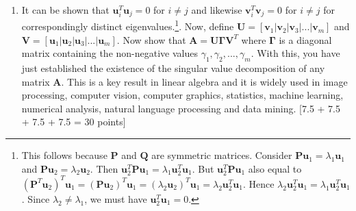 \documentclass[11pt]{article}
\begin{document}
\begin{enumerate}
\begin{enumerate}
\item It can be shown that $\boldsymbol{u}^T_i \boldsymbol{u}_j = 0$ for $i \neq j$ and likewise $\boldsymbol{v}^T_i \boldsymbol{v}_j = 0$ for $i \neq j$ for correspondingly distinct eigenvalues.\footnote{This follows because $\boldsymbol{P}$ and $\boldsymbol{Q}$ are symmetric matrices. Consider $\boldsymbol{Pu}_1 = \lambda_1 \boldsymbol{u}_1$ and $\boldsymbol{Pu}_2 = \lambda_2 \boldsymbol{u}_2$. Then $\boldsymbol{u}^T_2 \boldsymbol{P u}_1 = \lambda_1 \boldsymbol{u}^T_2 \boldsymbol{u}_1$. But $\boldsymbol{u}^T_2 \boldsymbol{P} \boldsymbol{u}_1$ also equal to $(\boldsymbol{P}^T \boldsymbol{u}_2)^T \boldsymbol{u}_1 = (\boldsymbol{P} \boldsymbol{u}_2)^T \boldsymbol{u}_1 = (\lambda_2 \boldsymbol{u}_2)^T \boldsymbol{u}_1 = \lambda_2 \boldsymbol{u}^T_2 \boldsymbol{u}_1$. Hence $\lambda_2 \boldsymbol{u}^T_2 \boldsymbol{u}_1 = \lambda_1 \boldsymbol{u}^T_2 \boldsymbol{u}_1$. Since $\lambda_2 \neq \lambda_1$, we must have $\boldsymbol{u}^T_2 \boldsymbol{u}_1 = 0$. }. Now, define $\boldsymbol{U} = [\boldsymbol{v}_1 | \boldsymbol{v}_2 | \boldsymbol{v}_3 | ...|\boldsymbol{v}_m]$ and $\boldsymbol{V} = [\boldsymbol{u}_1 | \boldsymbol{u}_2 | \boldsymbol{u}_3 | ... |\boldsymbol{u}_m]$. Now show that $\boldsymbol{A} = \boldsymbol{U} \boldsymbol{\Gamma} \boldsymbol{V}^T$ where $\boldsymbol{\Gamma}$ is a diagonal matrix containing the non-negative values $\gamma_1, \gamma_2, ..., \gamma_m$. With this, you have just established the existence of the singular value decomposition of any matrix $\boldsymbol{A}$. This is a key result in linear algebra and it is widely used in image processing, computer vision, computer graphics, statistics, machine learning, numerical analysis, natural language processing and data mining. \textsf[7.5 + 7.5 + 7.5 + 7.5 = 30 points]
\end{enumerate}


\end{enumerate}
\end{document}

